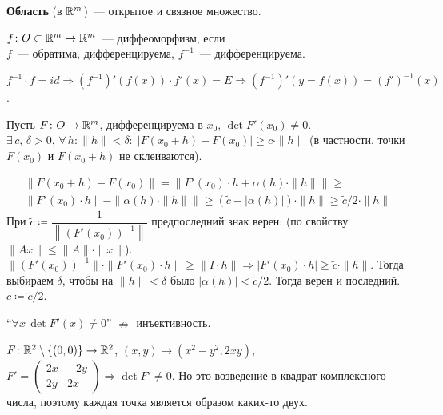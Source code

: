 	
	\medskip
	
\begin{defin*}
	\textbf{Область} (в $\rmy$)~--- открытое и связное множество.
\end{defin*}

\begin{defin*}
    $f\colon O\subset\rmy\to\rmy$~--- диффеоморфизм, если\\
    $f$~--- обратима, дифференцируема, $f^{-1}$~--- дифференцируема.
\end{defin*}

\begin{NB*} $f^{-1}\cdot f = id\Rightarrow \left(f^{-1}\right)'(f(x))\cdot f'(x)=E\Rightarrow \left(f^{-1}\right)'(y=f(x))={(f')}^{-1}(x)$.
\end{NB*}

\begin{Lemma*}
    Пусть $F\colon O\to\rmy$, дифференцируема в $x_0$, $\det F'(x_0)\neq 0$. \THEN $\exists\, c,\, \delta>0,\,\forall\,h: \|h\|<\delta:\; |F(x_0+h)-F(x_0)|\geqslant c\cdot \|h\|$ (в частности, точки $F(x_0)$ и $F(x_0+h)$ не склеиваются).
\end{Lemma*}

\begin{Proof}
\begin{multline*}
    \|F(x_0+h)-F(x_0)\|=\|F'(x_0)\cdot h+\alpha(h)\cdot\|h\|\|\geqslant \\ \|F'(x_0)\cdot h\| - \|\alpha(h)\cdot \|h\| \|\geqslant (\tilde{c}-|\alpha(h)|)\cdot\|h\|\geqslant {\tilde{c}/2} \cdot \|h\|
\end{multline*}
При $\tilde{c}\coloneqq \dfrac{1}{\left\|{(F'(x_0))}^{-1}\right\|}$ предпоследний знак верен: (по свойству $\|Ax\|\leqslant \|A\|\cdot\|x\|$).\\
$\|{(F'(x_0))}^{-1}\|\cdot\|F'(x_0)\cdot h\|\geqslant \|I\cdot h\| \Rightarrow \bigl|F'(x_0)\cdot h\bigr|\geqslant \tilde{c}\cdot\|h\|$. Тогда  выбираем $\delta$, чтобы на $\|h\|<\delta$ было $|\alpha(h)|<\tilde{c}/2$. Тогда верен и последний. $c\coloneqq \tilde{c}/2$.
\end{Proof}

\begin{NB*} ``$\forall x\, \det F'(x)\neq 0$'' $\nRightarrow$ инъективность. \end{NB*}
\begin{Example*}
    $F\colon \rmy[2]\setminus\{(0,0)\}\to\rmy[2]$, $(x,y)\mapsto (x^2-y^2, 2xy)$, $F' = \begin{pmatrix} 2x & -2y \\ 2y & 2x \end{pmatrix} \Rightarrow \det{F'}\neq 0$. Но это возведение в квадрат комплексного числа, поэтому каждая точка является образом каких-то двух.
\end{Example*}

